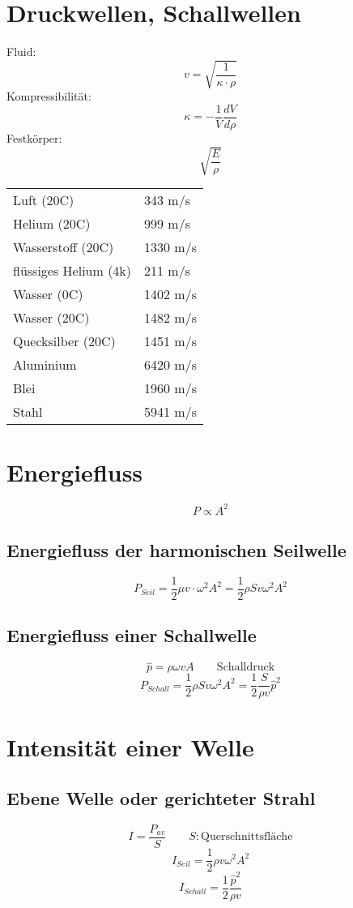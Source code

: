 \section{Druckwellen, Schallwellen}
Fluid: 
\[ \boxed{v = \sqrt{\frac{1}{\kappa \cdot \rho}}} \]
Kompressibilität: 
\[ \boxed{\kappa = -\frac{1}{V} \frac{d V}{d \rho}} \]
Festkörper: 
\[ \boxed{\sqrt{\frac{E}{\rho}}} \]
\begin{tabular}{ll}
Luft (20C) & 343 m/s \\
Helium (20C) & 999 m/s \\
Wasserstoff (20C) & 1330 m/s \\
flüssiges Helium (4k) & 211 m/s \\
Wasser (0C) & 1402 m/s \\
Wasser (20C) & 1482 m/s \\
Quecksilber (20C) & 1451 m/s \\
Aluminium & 6420 m/s \\
Blei & 1960 m/s \\
Stahl & 5941 m/s \\
\end{tabular}

\section{Energiefluss}
\[ \boxed{P \propto A^2} \]
\subsection{Energiefluss der harmonischen Seilwelle}
\[ \boxed{P_{Seil} = \frac{1}{2} \mu v \cdot \omega^2 A^2 
= \frac{1}{2} \rho S v \omega^2 A^2} \]
\subsection{Energiefluss einer Schallwelle}
\[ \boxed{\hat{p} = \rho \omega v A} \qquad \text{Schalldruck} \]
\[ \boxed{P_{Schall} = \frac{1}{2} \rho S v \omega^2 A^2 
= \frac{1}{2} \frac{S}{\rho v} \hat{p}^2} \]

\section{Intensität einer Welle}
\subsection{Ebene Welle oder gerichteter Strahl}
\[ \boxed{I = \frac{P_{av}}{S}} \qquad S: \text{Querschnittsfläche}\]
\[ \boxed{I_{Seil} = \frac{1}{2} \rho v \omega^2 A^2} \]
\[ \boxed{I_{Schall} = \frac{1}{2} \frac{\hat{p}^2}{\rho v}} \]
